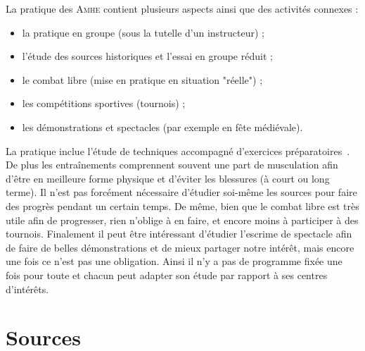 \noindent
La pratique des \textsc{Amhe} contient plusieurs aspects ainsi que des activités connexes :
\begin{itemize}
	\item la pratique en groupe (sous la tutelle d'un instructeur) ;
	\item l'étude des sources historiques et l'essai en groupe réduit ;
	\item le combat libre (mise en pratique en situation "réelle") ;
	\item les compétitions sportives (tournois) ;
	\item les démonstrations et spectacles (par exemple en fête médiévale).
\end{itemize}
La pratique inclue l'étude de techniques accompagné d'exercices préparatoires~\footnotemark{}.%
De plus les entraînements comprennent souvent une part de musculation afin d'être en meilleure forme physique et d'éviter les blessures (à court ou long terme).
Il n'est pas forcément nécessaire d'étudier soi-même les sources pour faire des progrès pendant un certain temps.
De même, bien que le combat libre est très utile afin de progresser, rien n'oblige à en faire, et encore moins à participer à des tournois.
Finalement il peut être intéressant d'étudier l'escrime de spectacle afin de faire de belles démonstrations et de mieux partager notre intérêt, mais encore une fois ce n'est pas une obligation.
Ainsi il n'y a pas de programme fixée une fois pour toute et chacun peut adapter son étude par rapport à ses centres d'intérêts.


\section{Sources}


